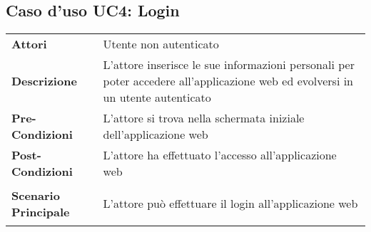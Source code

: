 \newpage
\subsection{Caso d'uso UC4: Login}
\label{UC4}

\begin{longtable}{ l | p{11cm}}
	\hline
	\rowcolor{Gray}
	 \multicolumn{2}{c}{UC4 - Login}\\
	 \hline
	\textbf{Attori} & Utente non autenticato \\
	\textbf{Descrizione} & L'attore inserisce le sue informazioni personali per poter accedere all'applicazione web ed evolversi in un utente autenticato \\
	\textbf{Pre-Condizioni} & L'attore si trova nella schermata iniziale dell'applicazione web \\
	\textbf{Post-Condizioni} & L'attore ha effettuato l'accesso all'applicazione web \\
	\textbf{Scenario Principale} & 
	\begin{enumerate*}[label=(\arabic*.),itemjoin={\newline}]
		\item L'attore può effettuare il login all'applicazione web
	\end{enumerate*}\\
\end{longtable}
